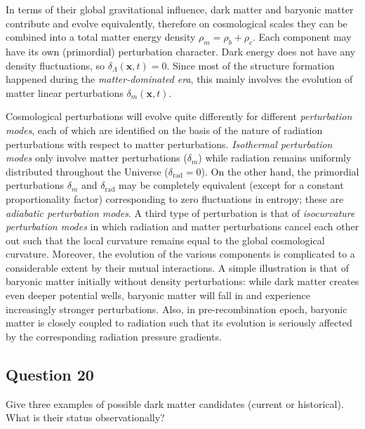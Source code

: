 \documentclass[a4paper,11pt]{article}
\begin{document}
{\noindent}In terms of their global gravitational influence, dark matter and baryonic matter contribute and evolve equivalently, therefore on cosmological scales they can be combined into a total matter energy density $\rho_m = \rho_b + \rho_c$. Each component may have its own (primordial) perturbation character. Dark energy does not have any density fluctuations, so $\delta_\Lambda(\mathbf{x},t) = 0$. Since most of the structure formation happened during the \textit{matter-dominated era}, this mainly involves the evolution of matter linear perturbations $\delta_m(\mathbf{x},t)$.

{\noindent}Cosmological perturbations will evolve quite differently for different \textit{perturbation modes}, each of which are identified on the basis of the nature of radiation perturbations with respect to matter perturbations. \textit{Isothermal perturbation modes} only involve matter perturbations ($\delta_m$) while radiation remains uniformly distributed throughout the 
Universe ($\delta_\mathrm{rad} = 0$). On the other hand, the primordial perturbations $\delta_m$ and $\delta_\mathrm{rad}$ may be completely equivalent (except for a constant proportionality factor) corresponding to zero fluctuations in entropy; these are \textit{adiabatic perturbation modes}. A third type of perturbation is that of \textit{isocurvature perturbation modes} in which radiation and matter perturbations cancel each other out such that the local curvature remains equal to the global cosmological curvature. Moreover, the evolution of the various components is complicated to a considerable extent by their mutual interactions. A simple illustration is that of baryonic matter initially without density perturbations: while dark matter creates even deeper potential wells, baryonic matter will fall in and experience increasingly stronger perturbations. Also, in pre-recombination epoch, baryonic matter is closely coupled to radiation such that its evolution is seriously affected by the corresponding radiation pressure gradients.

%
%

\newpage
\subsection{Question 20}

Give three examples of possible dark matter candidates (current or historical). What is their status observationally?
\end{document}
